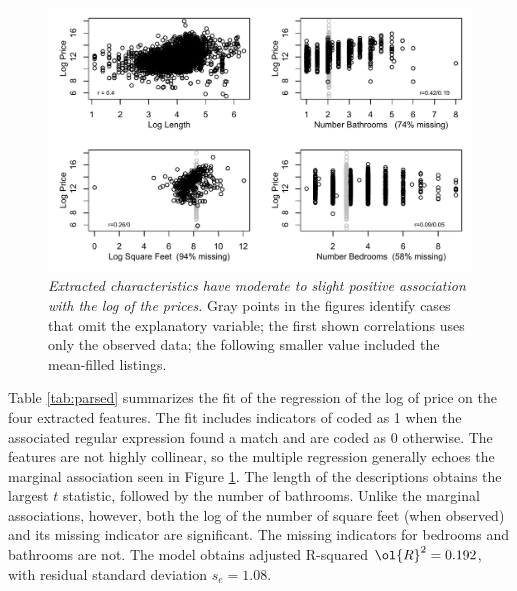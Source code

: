 \documentclass[10pt]{article}
\begin{document}
 \begin{figure}
  \caption{ \label{fig:parsed} { \sl Extracted characteristics have moderate to
 slight positive association with the log of the prices. } Gray points in the
 figures identify cases that omit the explanatory variable; the first shown
 correlations uses only the observed data; the following smaller value included
 the mean-filled listings. }
 
\centerline{
 \vspace{0.1in}
 \includegraphics[width=5in]{figures/parsed} }
 \vspace{0.2in}
 \end{figure}


 Table \ref{tab:parsed} summarizes the fit of the regression of the log of price
 on the four extracted features. The fit includes indicators of coded as 1 when
 the associated regular expression found a match and are coded as 0
 otherwise. The features are not highly collinear, so the multiple regression
 generally echoes the marginal association seen in Figure \ref{fig:parsed}.  The
 length of the descriptions obtains the largest $t$ statistic, followed by the
 number of bathrooms.  Unlike the marginal associations, however, both the log
 of the number of square feet (when observed) and its missing indicator are
 significant.  The missing indicators for bedrooms and bathrooms are not.  The
 model obtains adjusted R-squared $\ol{R}^2 = 0.192$, with residual standard
 deviation $s_e =1.08$.
\end{document}

